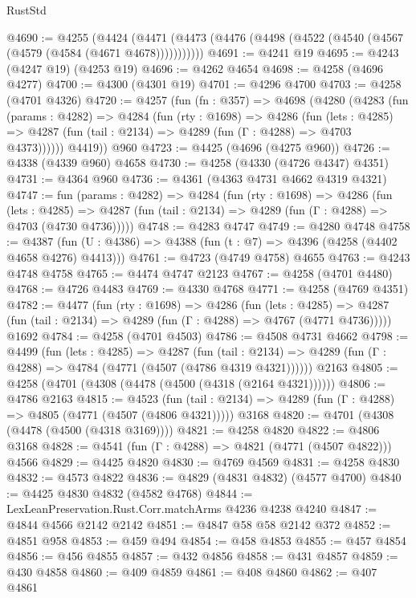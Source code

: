 \begin{lexlean}{RustStd}
\begin{coremodule}
{\begin{coremodule}
{{{{{{{{{{{{{{{{@4690 := @4255
    (@4424 (@4471 (@4473 (@4476 (@4498 (@4522 (@4540 (@4567 (@4579 (@4584 (@4671 @4678)))))))))))
@4691 := @4241 @19
@4695 := @4243 (@4247 @19) (@4253 @19)
@4696 := @4262 @4654
@4698 := @4258 (@4696 @4277)
@4700 := @4300 (@4301 @19)
@4701 := @4296 @4700
@4703 := @4258 (@4701 @4326)
@4720 := @4257
    (fun (fn : @357) =>
    @4698
      (@4280
        (@4283
          (fun (params : @4282) =>
          @4284
            (fun (rty : @1698) =>
            @4286
              (fun (lets : @4285) =>
              @4287 (fun (tail : @2134) => @4289 (fun (Γ : @4288) => @4703 @4373))))))
        @4419))
    @960
@4723 := @4425 (@4696 (@4275 @960))
@4726 := @4338 (@4339 @960) @4658
@4730 := @4258 (@4330 (@4726 @4347) @4351)
@4731 := @4364 @960
@4736 := @4361 (@4363 @4731 @4662 @4319 @4321)
@4747 := fun (params : @4282) =>
  @4284
    (fun (rty : @1698) =>
    @4286
      (fun (lets : @4285) =>
      @4287 (fun (tail : @2134) => @4289 (fun (Γ : @4288) => @4703 (@4730 @4736)))))
@4748 := @4283 @4747
@4749 := @4280 @4748
@4758 := @4387 (fun (U : @4386) => @4388 (fun (t : @7) => @4396 (@4258 (@4402 @4658 @4276) @4413)))
@4761 := @4723 (@4749 @4758) @4655
@4763 := @4243 @4748 @4758
@4765 := @4474 @4747 @2123
@4767 := @4258 (@4701 @4480)
@4768 := @4726 @4483
@4769 := @4330 @4768
@4771 := @4258 (@4769 @4351)
@4782 := @4477
    (fun (rty : @1698) =>
    @4286
      (fun (lets : @4285) =>
      @4287 (fun (tail : @2134) => @4289 (fun (Γ : @4288) => @4767 (@4771 @4736)))))
    @1692
@4784 := @4258 (@4701 @4503)
@4786 := @4508 @4731 @4662
@4798 := @4499
    (fun (lets : @4285) =>
    @4287
      (fun (tail : @2134) => @4289 (fun (Γ : @4288) => @4784 (@4771 (@4507 (@4786 @4319 @4321))))))
    @2163
@4805 := @4258 (@4701 (@4308 (@4478 (@4500 (@4318 (@2164 @4321))))))
@4806 := @4786 @2163
@4815 := @4523
    (fun (tail : @2134) => @4289 (fun (Γ : @4288) => @4805 (@4771 (@4507 (@4806 @4321)))))
    @3168
@4820 := @4701 (@4308 (@4478 (@4500 (@4318 @3169))))
@4821 := @4258 @4820
@4822 := @4806 @3168
@4828 := @4541 (fun (Γ : @4288) => @4821 (@4771 (@4507 @4822))) @4566
@4829 := @4425 @4820
@4830 := @4769 @4569
@4831 := @4258 @4830
@4832 := @4573 @4822
@4836 := @4829 (@4831 @4832) (@4577 @4700)
@4840 := @4425 @4830 @4832 (@4582 @4768)
@4844 := LexLeanPreservation.Rust.Corr.matchArms @4236 @4238 @4240
@4847 := @4844 @4566 @2142 @2142
@4851 := @4847 @58 @58 @2142 @372
@4852 := @4851 @958
@4853 := @459 @494
@4854 := @458 @4853
@4855 := @457 @4854
@4856 := @456 @4855
@4857 := @432 @4856
@4858 := @431 @4857
@4859 := @430 @4858
@4860 := @409 @4859
@4861 := @408 @4860
@4862 := @407 @4861
}}}}}}}}}}}}}}}}
\end{coremodule}}
\end{coremodule}
\end{lexlean}
